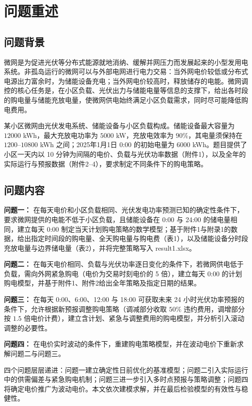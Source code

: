\documentclass[zihao=-4,a4paper,UTF8,fontset=none]{ctexart}
\begin{document}
\section{问题重述}

\subsection{问题背景}

微网是为促进光伏等分布式能源就地消纳、缓解并网压力而发展起来的小型发用电系统。非孤岛运行的微网可以与外部电网进行电力交易：当外网电价较低或分布式电源出力富余时，为储能设备充电；当外网电价较高时，释放储存的电能。微网调控的核心任务是，在小区负载、光伏出力与储能电量等信息的支撑下，给出各时段的购电量与储能充放电量，使微网供电始终满足小区负载需求，同时尽可能降低购电费用。

某小区微网由光伏发电系统、储能设备与小区负载构成。储能设备最大容量为 $12000$ kWh，最大充放电功率为 $5000$ kW，充放电效率为 $90\%$，其电量须保持在 $1200$--$10800$ kWh 之间；2025年1月1日 0:00 的初始电量为 $6000$ kWh。题目提供了小区一天内以 10 分钟为间隔的电价、负载与光伏功率数据（附件1），以及全年的实际运行与预报数据（附件2--4），要求制定不同条件下的购电策略。

\subsection{问题内容}

\textbf{问题一：} 在每天电价和小区负载相同、光伏发电功率预测已知的确定性条件下，要求微网提供的电能不低于小区负载，且储能设备在 0:00 与 24:00 的储电量相同，建立每天 0:00 制定当天计划购电策略的数学模型；基于附件1与附录1的数据，给出指定时间段的购电量、全天购电量与购电费（表1），以及储能设备分时段充放电量与边界储电量（表2），并将完整策略写入 result1.xlsx。

\textbf{问题二：} 在每天电价相同、负载与光伏功率逐日变化的条件下，若微网供电低于负载，需向外网紧急购电（电价为交易时刻电价的 5 倍），建立每天 0:00 的计划购电模型，并基于附件1、附件2给出全年策略及指定日期的结果。

\textbf{问题三：} 在每天 0:00、6:00、12:00 与 18:00 可获取未来 24 小时光伏功率预报的条件下，允许根据新预报调整购电策略（调减部分收取 $50\%$ 违约费用，调增部分按 $1.5$ 倍电价计费），建立含计划、紧急与调整费用的购电模型，并分析引入滚动调整的必要性。

\textbf{问题四：} 在电价实时波动的条件下，重建购电策略模型，并在波动电价下重新求解问题二与问题三。

四个问题层层递进：问题一建立确定性日前优化的基准模型；问题二引入实际运行中的供需偏差与紧急购电机制；问题三进一步引入多时点预报与策略调整；问题四将确定电价推广为波动电价。本文依次建模求解，并在最后检验模型的有效性与稳健性。
\end{document}
